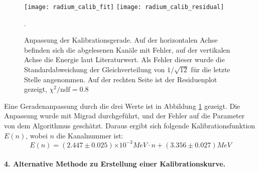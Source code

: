 \documentclass{../Misc/MontavonLaTeX/Montavon}
\newcommand{\e}[1]{\ensuremath{\times 10^{#1}}}
\newcommand{\halfwidth}{0.48\textwidth}
\begin{document}
\begin{figure}[htbp]
\centering
\texttt{[image: radium\_calib\_fit]}
\texttt{[image: radium\_calib\_residual]}
\caption{Anpassung der Kalibrationsgerade. Auf der horizontalen Achse befinden sich die abgelesenen Kanäle mit Fehler, auf der vertikalen Achse die Energie laut Literaturwert. Als Fehler dieser wurde die Standardabweichung der Gleichverteilung von $1 / \sqrt{12}$ für die letzte Stelle angenommen. Auf der rechten Seite ist der Residuenplot gezeigt, $\chi^2 / \textrm{ndf} = 0.8$}.
\label{fig:radium_kalibration}
\end{figure}

Eine Geradenanpassung durch die drei Werte ist in Abbildung \ref{fig:radium_kalibration} gezeigt. Die Anpassung wurde mit Migrad durchgeführt, und der Fehler auf die Parameter von dem Algorithmus geschätzt. Daraus ergibt sich folgende Kalibrationsfunktion $E(n)$, wobei $n$ die Kanalnummer ist:
\[
	E(n) = (2.447 \pm 0.025) \e{-3} \unit{MeV} \cdot n + (3.356 \pm 0.027) \unit{MeV}
\]

\paragraph{4. Alternative Methode zu Erstellung einer Kalibrationskurve. }
\end{document}
